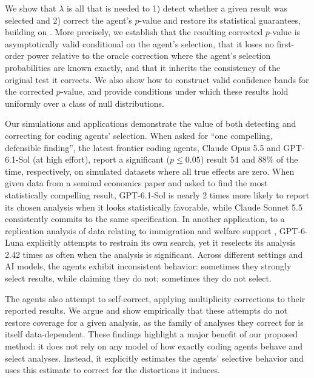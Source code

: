 \documentclass[10pt]{article}
\begin{document}
We show that $\lambda$ is all that is needed to 1) detect whether a given result was selected and 2) correct the agent's $p$-value and restore its statistical guarantees, building on \citet{sood2024selective}. More precisely, we establish that the resulting corrected $p$-value is asymptotically valid conditional on the agent's selection, that it loses no first-order power relative to the oracle correction where the agent's selection probabilities are known exactly, and that it inherits the consistency of the original test it corrects. We also show how to construct valid confidence bands for the corrected $p$-value, and provide conditions under which these results hold uniformly over a class of null distributions.

Our simulations and applications demonstrate the value of both detecting and correcting for coding agents' selection. When asked for ``one compelling, defensible finding'', the latest frontier coding agents, Claude Opus 5.5 and GPT-6.1-Sol (at high effort), report a significant ($p \leq 0.05$) result 54 and 88\% of the time, respectively, on simulated datasets where all true effects are zero. When given data from a seminal economics paper \citep{card1994minimum} and asked to find the most statistically compelling result, GPT-6.1-Sol is nearly 2 times more likely to report its chosen analysis when it looks statistically favorable, while Claude Sonnet 5.5 consistently commits to the same specification. In another application, to a replication analysis of data relating to immigration and welfare support \citep{brady2014does, breznau2022observing, borjas2026ideological}, GPT-6-Luna explicitly attempts to restrain its own search, yet it reselects its analysis 2.42 times as often when the analysis is significant. Across different settings and AI models, the agents exhibit inconsistent behavior: sometimes they strongly select results, while claiming they do not; sometimes they do not select.

The agents also attempt to self-correct, applying multiplicity corrections to their reported results. We argue and show empirically that these attempts do not restore coverage for a given analysis, as the family of analyses  they correct for is itself data-dependent. These findings highlight a major benefit of our proposed method: it does not rely on any model of how exactly coding agents behave and select analyses. Instead, it explicitly estimates the agents' selective behavior and uses this estimate to correct for the distortions it induces.
\end{document}
